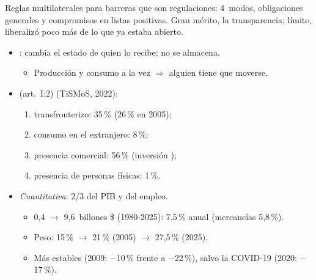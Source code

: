 \documentclass{article}
\begin{document}
\begin{columnas}
\begin{ideaclave}
Reglas multilaterales para barreras que son regulaciones: 4~modos, obligaciones generales y compromisos en listas positivas. Gran mérito, la transparencia; límite, liberalizó poco más de lo que ya estaba abierto.
\end{ideaclave}

\begin{itemize}
\item {}: cambia el estado de quien lo recibe; no se almacena.
  \begin{itemize}
  \item Producción y consumo a la vez $\Rightarrow$ alguien tiene que moverse.
  \end{itemize}
\item {} (art.~I:2) (TiSMoS, 2022):
  \begin{enumerate}
  \item transfronterizo: 35\,\% (26\,\% en 2005);
  \item consumo en el extranjero: 8\,\%;
  \item presencia comercial: 56\,\% (inversión );
  \item presencia de personas físicas: 1\,\%.
  \end{enumerate}
\end{itemize}
\begin{itemize}
\item \emph{Cuantitativa}: 2/3 del PIB y del empleo.
  \begin{itemize}
  \item 0,4 $\to$ 9,6~billones \$ (1980-2025): 7,5\,\% anual (mercancías 5,8\,\%).
  \item Peso: 15\,\% $\to$ 21\,\% (2005) $\to$ 27,5\,\% (2025).
  \item Más estables (2009: $-$10\,\% frente a $-$22\,\%), salvo la COVID-19 (2020: $-$17\,\%).
  \end{itemize}
\end{itemize}

\end{columnas}
\end{document}
